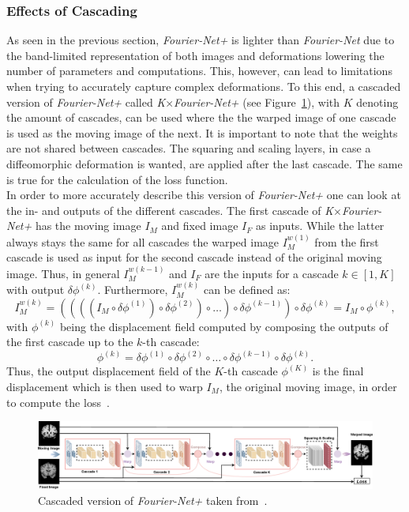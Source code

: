 \subsubsection{Effects of Cascading} \label{SubSubSec:EffectsCascading}
As seen in the previous section, \emph{Fourier-Net+} is lighter than \emph{Fourier-Net} due to the band-limited representation of both images and deformations lowering the number of parameters and computations. This, however, can lead to limitations when trying to accurately capture complex deformations. To this end, a cascaded version of \emph{Fourier-Net+} called \emph{K$\times$Fourier-Net+} (see Figure~\ref{fig:Fourier-Net+Cascaded}), with $K$ denoting the amount of cascades, can be used where the the warped image of one cascade is used as the moving image of the next. It is important to note that the weights are not shared between cascades. The squaring and scaling layers, in case a diffeomorphic deformation is wanted, are applied after the last cascade. The same is true for the calculation of the loss function.\\
In order to more accurately describe this version of \emph{Fourier-Net+} one can look at the in- and outputs of the different cascades. The first cascade of \emph{K$\times$Fourier-Net+} has the moving image $I_M$ and fixed image $I_F$ as inputs. While the latter always stays the same for all cascades the warped image $I_M^{w(1)}$ from the first cascade is used as input for the second cascade instead of the original moving image. Thus, in general $I_M^{w(k-1)}$ and $I_F$ are the inputs for a cascade $k \in [1, K]$ with output $\delta \phi^{(k)}$. Furthermore, $I_M^{w(k)}$ can be defined as:
\begin{equation}
	I_M^{w(k)} = ((((I_M \circ \delta \phi^{(1)}) \circ \delta \phi^{(2)}) \circ \dots ) \circ \delta \phi^{(k-1)}) \circ \delta \phi^{(k)} = I_M \circ  \phi^{(k)},
\end{equation}
with $\phi^{(k)}$ being the displacement field computed by composing the outputs of the first cascade up to the $k$-th cascade:
\begin{equation}
	\phi^{(k)} = \delta \phi^{(1)} \circ \delta \phi^{(2)} \circ \dots \circ \delta \phi^{(k-1)} \circ \delta \phi^{(k)}.
\end{equation}
Thus, the output displacement field of the $K$-th cascade $\phi^{(K)}$ is the final displacement which is then used to warp $I_M$, the original moving image, in order to compute the loss~\cite{Fourier-Net+}.

\begin{figure}[h] %
	\centering
	\graphicspath{{images/}{\main/images/}}
	\includegraphics[width=\linewidth]{ArchitectureFourier-Net+Cascaded.png} 
	\caption{Cascaded version of \emph{Fourier-Net+} taken from~\cite{Fourier-Net+}.}
	\label{fig:Fourier-Net+Cascaded}
\end{figure}



